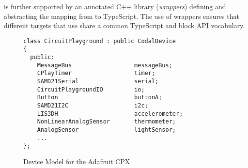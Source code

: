  \MC is further supported by an annotated C++ library (\emph{\MC wrappers}) defining and abstracting the mapping from \CO to TypeScript. The use of \MC wrappers ensures that different \MC targets that use \CO share a common TypeScript and block API vocabulary.

\begin{figure}
\begin{lstlisting}
class CircuitPlayground : public CodalDevice
{
  public:
    MessageBus                  messageBus;
    CPlayTimer                  timer;
    SAMD21Serial                serial;
    CircuitPlaygroundIO         io;
    Button                      buttonA;
    SAMD21I2C                   i2c;
    LIS3DH                      accelerometer;
    NonLinearAnalogSensor       thermometer;
    AnalogSensor                lightSensor;
    ...
};
\end{lstlisting}
\caption{\label{fig:codalDeviceModel}Device Model for the Adafruit CPX}
\end{figure}




